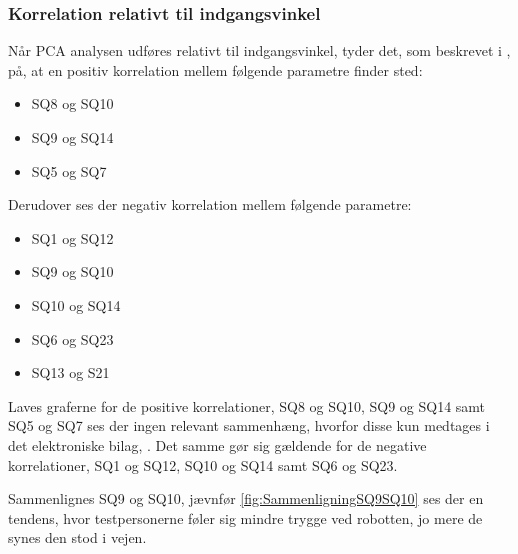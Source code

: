 \subsubsection{Korrelation relativt til indgangsvinkel}
Når PCA analysen udføres relativt til indgangsvinkel, tyder det, som beskrevet i , på, at en positiv korrelation mellem følgende parametre finder sted:
\begin{itemize}
	\item SQ8 og SQ10
	\item SQ9 og SQ14
	\item SQ5 og SQ7
\end{itemize}
%
Derudover ses der negativ korrelation mellem følgende parametre:
\begin{itemize}
	\item SQ1 og SQ12
	\item SQ9 og SQ10
	\item SQ10 og SQ14
	\item SQ6 og SQ23
	\item SQ13 og S21
\end{itemize}
%
Laves graferne for de positive korrelationer, SQ8 og SQ10, SQ9 og SQ14 samt SQ5 og SQ7 ses der ingen relevant sammenhæng, hvorfor disse kun medtages i det elektroniske bilag, . Det samme gør sig gældende for de negative korrelationer, SQ1 og SQ12, SQ10 og SQ14 samt SQ6 og SQ23. 

Sammenlignes SQ9 og SQ10, jævnfør \autoref{fig:SammenligningSQ9SQ10} ses der en tendens, hvor testpersonerne føler sig mindre trygge ved robotten, jo mere de synes den stod i vejen. 

